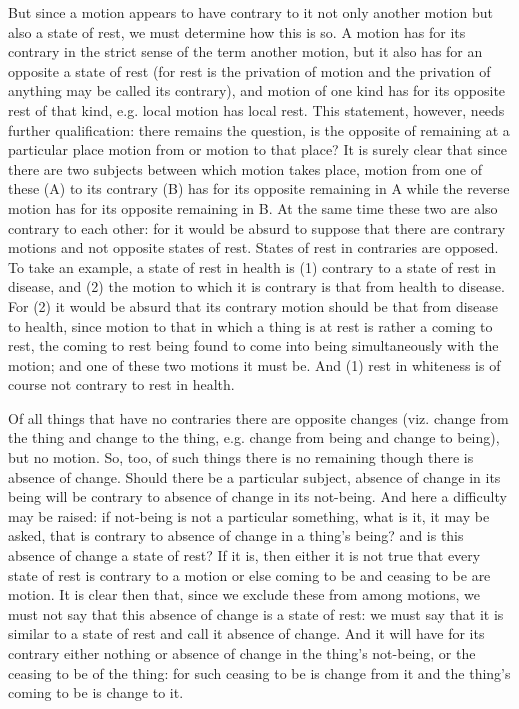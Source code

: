 But since a motion appears to have contrary to it not only another
motion but also a state of rest, we must determine how this is so.
A motion has for its contrary in the strict sense of the term another
motion, but it also has for an opposite a state of rest (for rest
is the privation of motion and the privation of anything may be called
its contrary), and motion of one kind has for its opposite rest of
that kind, e.g. local motion has local rest. This statement, however,
needs further qualification: there remains the question, is the opposite
of remaining at a particular place motion from or motion to that place?
It is surely clear that since there are two subjects between which
motion takes place, motion from one of these (A) to its contrary (B)
has for its opposite remaining in A while the reverse motion has for
its opposite remaining in B. At the same time these two are also contrary
to each other: for it would be absurd to suppose that there are contrary
motions and not opposite states of rest. States of rest in contraries
are opposed. To take an example, a state of rest in health is (1)
contrary to a state of rest in disease, and (2) the motion to which
it is contrary is that from health to disease. For (2) it would be
absurd that its contrary motion should be that from disease to health,
since motion to that in which a thing is at rest is rather a coming
to rest, the coming to rest being found to come into being simultaneously
with the motion; and one of these two motions it must be. And (1)
rest in whiteness is of course not contrary to rest in health.

Of all things that have no contraries there are opposite changes (viz.
change from the thing and change to the thing, e.g. change from being
and change to being), but no motion. So, too, of such things there
is no remaining though there is absence of change. Should there be
a particular subject, absence of change in its being will be contrary
to absence of change in its not-being. And here a difficulty may be
raised: if not-being is not a particular something, what is it, it
may be asked, that is contrary to absence of change in a thing's being?
and is this absence of change a state of rest? If it is, then either
it is not true that every state of rest is contrary to a motion or
else coming to be and ceasing to be are motion. It is clear then that,
since we exclude these from among motions, we must not say that this
absence of change is a state of rest: we must say that it is similar
to a state of rest and call it absence of change. And it will have
for its contrary either nothing or absence of change in the thing's
not-being, or the ceasing to be of the thing: for such ceasing to
be is change from it and the thing's coming to be is change to it.

